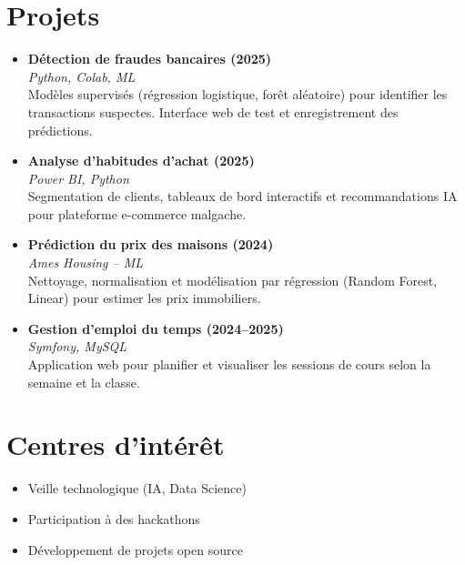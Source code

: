 \documentclass[a4paper,10pt]{article}
\begin{document}
\hfill
\begin{minipage}[t]{0.58\textwidth}

\section*{Projets}
\begin{itemize}[leftmargin=*, label={\color{secondarycolor}\scriptsize{}}]
  \item \textbf{Détection de fraudes bancaires (2025)}\\
  \textit{Python, Colab, ML}\\
  Modèles supervisés (régression logistique, forêt aléatoire) pour identifier les transactions suspectes. Interface web de test et enregistrement des prédictions.
  \vspace{4pt}
  
  \item \textbf{Analyse d'habitudes d'achat (2025)}\\
  \textit{Power BI, Python}\\
  Segmentation de clients, tableaux de bord interactifs et recommandations IA pour plateforme e-commerce malgache.
  \vspace{4pt}
  
  \item \textbf{Prédiction du prix des maisons (2024)}\\
  \textit{Ames Housing – ML}\\
  Nettoyage, normalisation et modélisation par régression (Random Forest, Linear) pour estimer les prix immobiliers.
  \vspace{4pt}
  
  \item \textbf{Gestion d'emploi du temps (2024–2025)}\\
  \textit{Symfony, MySQL}\\
  Application web pour planifier et visualiser les sessions de cours selon la semaine et la classe.
\end{itemize}

\section*{Centres d'intérêt}
\begin{itemize}[leftmargin=*, label={\color{secondarycolor}\scriptsize{}}]
  \item Veille technologique (IA, Data Science)
  \item Participation à des hackathons
  \item Développement de projets open source
\end{itemize}

\end{minipage}
\end{document}
